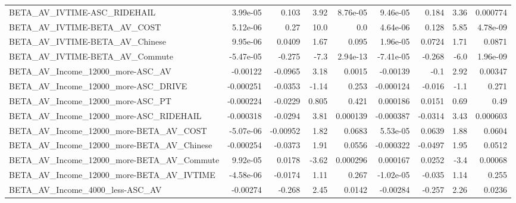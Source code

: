 \begin{tabular}{lrrrrrrrr}
BETA\_AV\_IVTIME-ASC\_RIDEHAIL                        &    3.99e-05 &        0.103 &      3.92 & 8.76e-05 &   9.46e-05 &       0.184 &         3.36 &      0.000774 \\
BETA\_AV\_IVTIME-BETA\_AV\_COST                        &    5.12e-06 &         0.27 &      10.0 &      0.0 &   4.64e-06 &       0.128 &         5.85 &      4.78e-09 \\
BETA\_AV\_IVTIME-BETA\_AV\_Chinese                     &    9.95e-06 &       0.0409 &      1.67 &    0.095 &   1.96e-05 &      0.0724 &         1.71 &        0.0871 \\
BETA\_AV\_IVTIME-BETA\_AV\_Commute                     &   -5.47e-05 &       -0.275 &      -7.3 & 2.94e-13 &  -7.41e-05 &      -0.268 &         -6.0 &      1.96e-09 \\
BETA\_AV\_Income\_12000\_more-ASC\_AV                   &    -0.00122 &      -0.0965 &      3.18 &   0.0015 &   -0.00139 &        -0.1 &         2.92 &       0.00347 \\
BETA\_AV\_Income\_12000\_more-ASC\_DRIVE                &   -0.000251 &      -0.0353 &     -1.14 &    0.253 &  -0.000124 &      -0.016 &         -1.1 &         0.271 \\
BETA\_AV\_Income\_12000\_more-ASC\_PT                   &   -0.000224 &      -0.0229 &     0.805 &    0.421 &   0.000186 &      0.0151 &         0.69 &          0.49 \\
BETA\_AV\_Income\_12000\_more-ASC\_RIDEHAIL             &   -0.000318 &      -0.0294 &      3.81 & 0.000139 &  -0.000387 &     -0.0314 &         3.43 &      0.000603 \\
BETA\_AV\_Income\_12000\_more-BETA\_AV\_COST             &   -5.07e-06 &     -0.00952 &      1.82 &   0.0683 &   5.53e-05 &      0.0639 &         1.88 &        0.0604 \\
BETA\_AV\_Income\_12000\_more-BETA\_AV\_Chinese          &   -0.000254 &      -0.0373 &      1.91 &   0.0556 &  -0.000322 &     -0.0497 &         1.95 &        0.0512 \\
BETA\_AV\_Income\_12000\_more-BETA\_AV\_Commute          &    9.92e-05 &       0.0178 &     -3.62 & 0.000296 &   0.000167 &      0.0252 &         -3.4 &       0.00068 \\
BETA\_AV\_Income\_12000\_more-BETA\_AV\_IVTIME           &   -4.58e-06 &      -0.0174 &      1.11 &    0.267 &  -1.02e-05 &      -0.035 &         1.14 &         0.255 \\
BETA\_AV\_Income\_4000\_less-ASC\_AV                    &    -0.00274 &       -0.268 &      2.45 &   0.0142 &   -0.00284 &      -0.257 &         2.26 &        0.0236 \\

\end{tabular}
